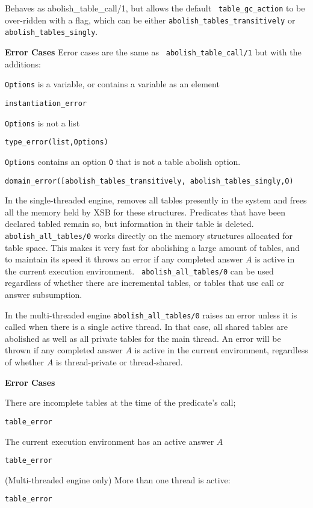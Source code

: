 \begin{description}
\begin{description}
%
Behaves as {abolish\_table\_call/1}, but allows the default {\tt
  table\_gc\_action} to be over-ridden with a flag, which can be either 
{\tt abolish\_tables\_transitively} or {\tt abolish\_tables\_singly}.

{\bf Error Cases} Error cases are the same as {\tt
  abolish\_table\_call/1} but with the additions: 
\bi
\item {\tt Options} is a variable, or contains a variable as an element
\bi
\item {\tt instantiation\_error}
\ei
\item {\tt Options} is not a list
\bi
\item {\tt type\_error(list,Options)}
\ei
\item {\tt Options} contains an option {\tt O} that is not a
  table abolish option.
\bi
\item {\tt domain\_error([abolish\_tables\_transitively, abolish\_tables\_singly,O)}
\ei
\ei




%
In the single-threaded engine, removes all tables presently in the
system and frees all the memory held by XSB for these structures.
Predicates that have been declared tabled remain so, but information
in their table is deleted.  {\tt abolish\_all\_tables/0} works
directly on the memory structures allocated for table space.  This
makes it very fast for abolishing a large amount of tables, and to
maintain its speed it throws an error if any completed answer $A$ is
active in the current execution environment.  {\tt
  abolish\_all\_tables/0} can be used regardless of whether there are
incremental tables, or tables that use call or answer subsumption.

In the multi-threaded engine {\tt abolish\_all\_tables/0} raises an
error unless it is called when there is a single active thread.  In
that case, all shared tables are abolished as well as all private
tables for the main thread.  An error will be thrown if any completed
answer $A$ is active in the current environment, regardless of whether
$A$ is thread-private or thread-shared.  



{\bf Error Cases}
\bi
\item There are incomplete tables at the time of the predicate's call;
\bi
\item 	{\tt table\_error}
\ei
\item The current execution environment has an active answer $A$
\bi
\item 	{\tt table\_error}
\ei
\item (Multi-threaded engine only) More than one thread is active:
\bi
\item 	{\tt table\_error}
\ei
%
%
\ei


\end{description}
\end{description}
